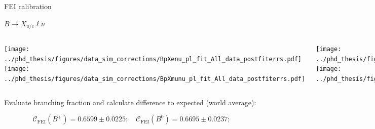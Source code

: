\documentclass[xcolor=dvipsnames]{beamer}
\begin{document}
\begin{frame}{FEI calibration}

   \centering\scriptsize

   $B\rightarrow X_{u/c} \ell \nu$

   \vspace{0pt}

   \begin{columns}
\centering
      \texttt{[image: ../phd\_thesis/figures/data\_sim\_corrections/BpXenu\_pl\_fit\_All\_data\_postfiterrs.pdf]}
      \texttt{[image: ../phd\_thesis/figures/data\_sim\_corrections/BpXmunu\_pl\_fit\_All\_data\_postfiterrs.pdf]}

      \centering
      \texttt{[image: ../phd\_thesis/figures/data\_sim\_corrections/B0Xenu\_pl\_fit\_All\_data\_postfiterrs.pdf]}
      \texttt{[image: ../phd\_thesis/figures/data\_sim\_corrections/B0Xenu\_pl\_fit\_All\_data\_postfiterrs.pdf]}

   \end{columns}

\vspace{0pt}

   Evaluate branching fraction and calculate difference to expected (world average):

   \begin{equation*}\label{eq:fei_calibration}
      \mathcal{C}_{\mathrm{FEI}}(B^+) = 0.6599 \pm 0.0225; \quad \mathcal{C}_{\mathrm{FEI}}(B^0) = 0.6695 \pm 0.0237;
  \end{equation*}

\end{frame}
\end{document}
